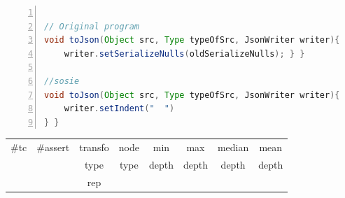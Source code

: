 \begin{minipage}{\columnwidth}
\begin{lstlisting}[caption={\texttt{toJson} in GSON and a sosie},language=java,numbers=left]

// Original program
void toJson(Object src, Type typeOfSrc, JsonWriter writer){
    writer.setSerializeNulls(oldSerializeNulls); } }

//sosie
void toJson(Object src, Type typeOfSrc, JsonWriter writer){
    writer.setIndent("  ") 
} }
\end{lstlisting}
\tabcolsep=0.11cm
\begin{tabular}{>{\small}c>{\small}c>{\small}c>{\small}c>{\small}c>{\small}c>{\small}c>{\small}c}
\hline
\rowcolor{lightgray} \#tc & \#assert & transfo & node & min & max & median & mean   \\
\rowcolor{lightgray}  & & type & type & depth  & depth & depth & depth  \\ 
\hline
 &  & rep &  &  &  &  & \\
\hline
\end{tabular}
\end{minipage}
